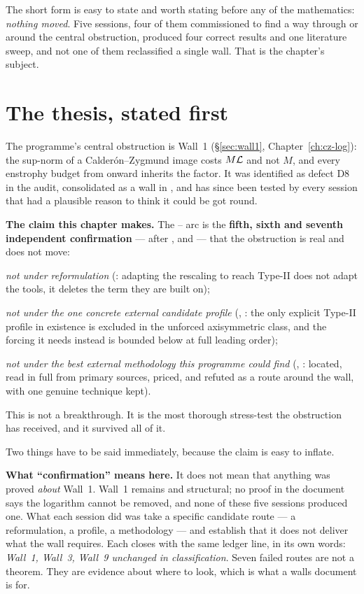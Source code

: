 The short form is easy to state and worth stating before any of the
mathematics: \emph{nothing moved}. Five sessions, four of them commissioned to
find a way through or around the central obstruction, produced four correct
results and one literature sweep, and not one of them reclassified a single
wall. That is the chapter's subject.

\section{The thesis, stated first}
\label{sec:pt-thesis}

The programme's central obstruction is Wall~1 (\S\ref{sec:wall1},
Chapter~\ref{ch:cz-log}): the sup-norm of a Calder\'on--Zygmund image costs
\(M\mathcal{L}\) and not \(M\), and every enstrophy budget from  onward
inherits the factor. It was identified as defect D8 in the  audit,
consolidated as a wall in , and has since been tested by every session
that had a plausible reason to think it could be got round.

\begin{record}
\textbf{The claim this chapter makes.} The -- arc is the
\textbf{fifth, sixth and seventh independent confirmation} --- after ,
 and  --- that the obstruction is real and does not move:

\smallskip
\emph{not under reformulation} (: adapting the rescaling to reach
Type-II does not adapt the tools, it deletes the term they are built on);

\emph{not under the one concrete external candidate profile} (,
: the only explicit Type-II profile in existence is excluded in the
unforced axisymmetric class, and the forcing it needs instead is bounded below
at full leading order);

\emph{not under the best external methodology this programme could find}
(, : located, read in full from primary sources, priced, and
refuted as a route around the wall, with one genuine technique kept).

\smallskip
This is not a breakthrough. It is the most thorough stress-test the
obstruction has received, and it survived all of it.
\end{record}

Two things have to be said immediately, because the claim is easy to inflate.

\textbf{What ``confirmation'' means here.} It does not mean that anything was
proved \emph{about} Wall~1. Wall~1 remains \OPEN{} and structural; no proof in
the document says the logarithm cannot be removed, and none of these five
sessions produced one. What each session did was take a specific candidate
route --- a reformulation, a profile, a methodology --- and establish that it
does not deliver what the wall requires. Each closes with the same ledger line,
in its own words: \emph{Wall~1, Wall~3, Wall~9 unchanged in classification}.
Seven failed routes are not a theorem. They are evidence about where to look,
which is what a walls document is for.

